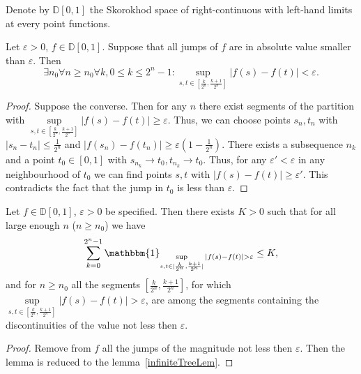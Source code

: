\documentclass[12pt, a4paper, titlepage]{article}
\begin{document}
Denote by $\mathbb{D}[0,1]$ the Skorokhod space of right-continuous with left-hand limits at every point
functions. 
\begin{lem}\label{infiniteTreeLem}
 Let $\varepsilon>0$, $f\in \mathbb{D}[0,1]$. Suppose that all jumps of $f$
 are in absolute value smaller than $\varepsilon.$
 Then
 $$\exists n_0 \forall n\ge n_0 \forall k, 0\le k \le 2^n-1 \colon 
 \sup\limits_{s,t \in [\frac{k}{2^n}, \frac{k+1}{2^n}]} |f(s)-f(t)|<\varepsilon.$$ 
\end{lem}
\begin{proof}
 Suppose the converse. Then for any $n$ there exist segments of the partition
 with $\sup\limits_{s,t \in [\frac{k}{2^n}, \frac{k+1}{2^n}]} |f(s)-f(t)| \ge \varepsilon.$
 Thus, we can choose points $s_n, t_n$ with $|s_n-t_n| \le \frac{1}{2^n}$
 and $|f(s_n)-f(t_n)| \ge \varepsilon(1-\frac{1}{2^n})$.
 There exists a subsequence $n_k$ and a point $t_0 \in [0,1]$ with 
 $s_{n_k}\to t_0, t_{n_k}\to t_0$. Thus, for any $\varepsilon' < \varepsilon$
 in any neighbourhood of $t_0$
 we can find points $s, t$ with $|f(s)-f(t)| \ge \varepsilon'.$ 
 This contradicts the fact that the jump in $t_0$ is less than $\varepsilon$. 
\end{proof}

\begin{lem}\label{boundedJumpsNumberLem}
 Let $f\in \mathbb{D}[0,1]$, $\varepsilon>0$ be specified. 
 Then there exists $K>0$ such that for all large enough $n$ ($n \ge n_0$) 
 we have $$\sum\limits_{k=0}^{2^n-1}\mathbbm{1}_{\sup\limits_{s,t \in [\frac{k}{2^n}, \frac{k+1}{2^n}]}
|f(s)-f(t)|>\varepsilon} \le K,$$
and for $n \ge n_0$ all the segments $[\frac{k}{2^n}, \frac{k+1}{2^n}]$, for which
$\sup\limits_{s,t \in [\frac{k}{2^n}, \frac{k+1}{2^n}]}|f(s)-f(t)|>\varepsilon$,
are among the segments containing the discontinuities of the value not less then $\varepsilon.$
\end{lem}
\begin{proof}
 Remove from $f$ all the jumps of the magnitude not less then $\varepsilon.$ 
Then the lemma is reduced to the lemma~\ref{infiniteTreeLem}.
\end{proof}
\end{document}
